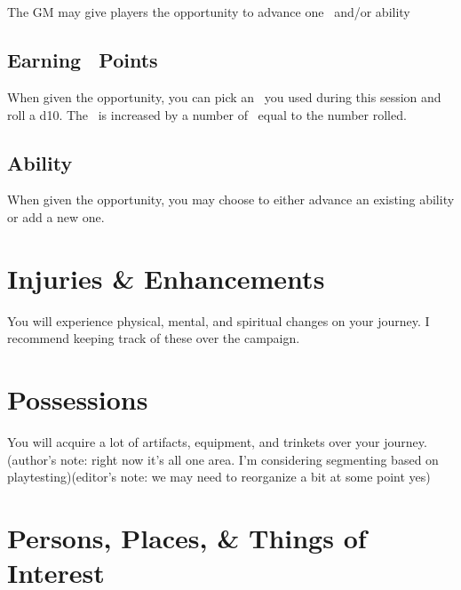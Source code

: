 \section{\advancement\index{\advancement}}\label{sec:advancement}
The GM may give players the opportunity to advance one \attribute\ and/or ability

\subsection{Earning \attribute\ Points}\label{subsec:adv_techniques}
When given the opportunity, you can pick an \attribute\ you used during this session and roll a d10. The \attribute\ is increased by a number of \attrval\ equal to the number rolled.

\subsection{Ability \advancement}\label{subsec:adv_ability}
When given the opportunity, you may choose to either advance an existing ability or add a new one.
\section{Injuries \& Enhancements}\label{sec:adv_injuries}
You will experience physical, mental, and spiritual changes on your journey. I recommend keeping track of these over the campaign.

\section{Possessions}\label{sec:possessions}
You will acquire a lot of artifacts, equipment, and trinkets over your journey. (author's note: right now it's all one area. I'm considering segmenting based on playtesting)(editor's note: we may need to reorganize a bit at some point yes)

\section{Persons, Places, \& Things of Interest}\label{sec:interests}
